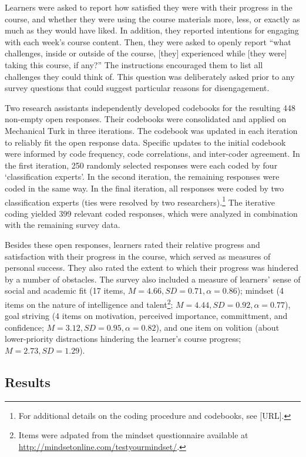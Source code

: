 \documentclass{sigchi}\usepackage[]{graphicx}\usepackage[]{color}
\begin{document}
Learners were asked to report how satisfied they were with their progress in the course, and whether they were using the course materials more, less, or exactly as much as they would have liked. In addition, they reported intentions for engaging with each week's course content. Then, they were asked to openly report ``what challenges, inside or outside of the course, [they] experienced while [they were] taking this course, if any?'' The instructions encouraged them to list all challenges they could think of. This question was deliberately asked prior to any survey questions that could suggest particular reasons for disengagement.

Two research assistants independently developed codebooks for the resulting 448 non-empty open responses. Their codebooks were consolidated and applied on Mechanical Turk in three iterations. The codebook was updated in each iteration to reliably fit the open response data. Specific updates to the initial codebook were informed by code frequency, code correlations, and inter-coder agreement. In the first iteration, 250 randomly selected responses were each coded by four `classification experts'. In the second iteration, the remaining responses were coded in the same way. In the final iteration, all responses were coded by two classification experts (ties were resolved by two researchers).\footnote{For additional details on the coding procedure and codebooks, see [URL].} The iterative coding yielded 399 relevant coded responses, which were analyzed in combination with the remaining survey data.

Besides these open responses, learners rated their relative progress and satisfaction with their progress in the course, which served as measures of personal success. They also rated the extent to which their progress was hindered by a number of obstacles. The survey also included a measure of learners' sense of social and academic fit \cite{walton2007question} (17 items, $M=4.66, SD=0.71, \alpha=0.86$); mindset (4 items on the nature of intelligence and talent\footnote{Items were adpated from the mindset questionnaire available at \url{http://mindsetonline.com/testyourmindset/}.}; $M=4.44, SD=0.92, \alpha=0.77$), goal striving (4 items on motivation, perceived importance, committment, and confidence; $M=3.12, SD=0.95, \alpha=0.82$), and one item on volition (about lower-priority distractions hindering the learner's course progress; $M=2.73, SD=1.29$).

\subsection{Results}
\end{document}
